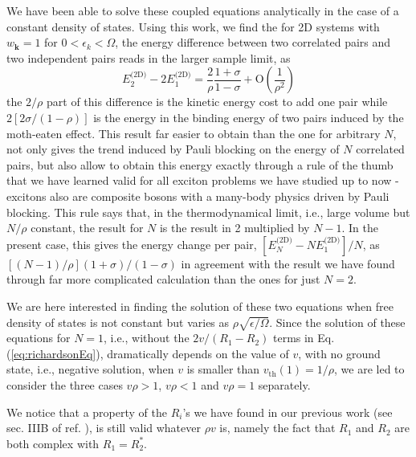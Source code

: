 \documentclass{article}
\newcommand{\vk}{\ensuremath{\mathbf{k}}}
\newcommand{\td}{{\ensuremath{{\text{(2D)}}}}}
\begin{document}
We have been able to solve these coupled equations analytically in the case of a constant density of states\cite{combescotBCS}.  Using this work, we find the for 2D systems with $w_\vk=1$ for $0<\epsilon_k<\Omega$, the energy difference between two correlated pairs and two independent pairs reads in the larger sample limit, as 
\begin{equation}
E^{\td}_2-2E_1^{\td}=\frac{2}{\rho}\frac{1+\sigma}{1-\sigma}+\text{O}(\frac{1}{\rho^2})
\label{eq:}
\end{equation}
the $2/\rho$ part of this difference is the kinetic energy cost to add one pair while $2[2\sigma/(1-\rho)]$ is the energy in the binding energy of two pairs induced by the moth-eaten effect. This result far easier to obtain than the one for arbitrary $N$, not only gives the trend induced by Pauli blocking on the energy of $N$ correlated pairs, but also allow to obtain this energy exactly through a rule of the thumb that we have learned valid for all exciton problems we have studied up to now - excitons also are composite bosons with a many-body physics driven by Pauli blocking.  This rule says that, in the thermodynamical limit, i.e., large volume but $N/\rho$ constant, the result for $N$ is the result in 2 multiplied by $N-1$.  In the present case, this gives the energy change per pair, $[E^{\td}_N-NE^{\td}_1]/N$, as $[(N-1)/\rho](1+\sigma)/(1-\sigma)$ in agreement with the result we have found through far more complicated calculation than the ones for just $N=2$.

We are here interested in finding the solution of these two equations when free density of states is not constant but varies as $\rho\sqrt{\epsilon/\Omega}$.  Since the solution of these equations for $N=1$, i.e., without the $2v/(R_1-R_2)$ terms in Eq. (\ref{eq:richardsonEq}), dramatically depends on the value of $v$, with no ground state, i.e., negative solution, when $v$ is smaller than $v_{\text{th}}(1)=1/\rho$, we are led to consider the three cases $v\rho>1$, $v\rho<1$ and $v\rho=1$ separately. 

We notice that a property of the $R_i$'s we have found in our previous work (see sec. IIIB of ref. \cite{combescotBCS}), is still valid whatever $\rho{}v$ is, namely the fact that $R_1$ and $R_2$ are both complex with $R_1=R_2^*$.%

\end{document}
